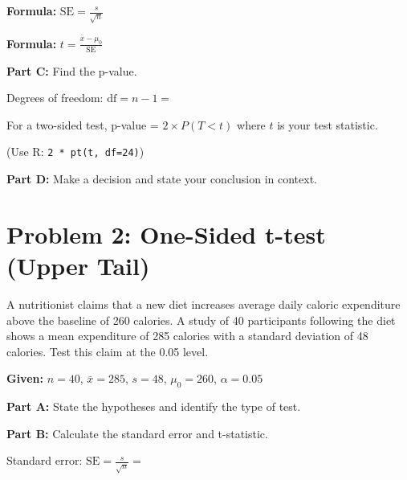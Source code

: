 \documentclass[11pt]{article}
\begin{document}
\textbf{Formula:} $\text{SE} = \frac{s}{\sqrt{n}}$

\vspace{2cm}

\textbf{Formula:} $t = \frac{\bar{x} - \mu_0}{\text{SE}}$

\vspace{2cm}

\textbf{Part C:} Find the p-value.

\vspace{0.3cm}

Degrees of freedom: $\text{df} = n - 1 = $

\vspace{0.5cm}

For a two-sided test, p-value = $2 \times P(T < t)$ where $t$ is your test statistic.

(Use R: \texttt{2 * pt(t, df=24)})

\vspace{2cm}

\textbf{Part D:} Make a decision and state your conclusion in context.

\vspace{3cm}

\newpage

\section{Problem 2: One-Sided t-test (Upper Tail)}

A nutritionist claims that a new diet increases average daily caloric expenditure above the baseline of 260 calories. A study of 40 participants following the diet shows a mean expenditure of 285 calories with a standard deviation of 48 calories. Test this claim at the 0.05 level.

\textbf{Given:} $n = 40$, $\bar{x} = 285$, $s = 48$, $\mu_0 = 260$, $\alpha = 0.05$

\vspace{6pt}

\textbf{Part A:} State the hypotheses and identify the type of test.

\vspace{3cm}

\textbf{Part B:} Calculate the standard error and t-statistic.

\vspace{0.3cm}

Standard error: $\text{SE} = \frac{s}{\sqrt{n}} = $

\vspace{2cm}
\end{document}
